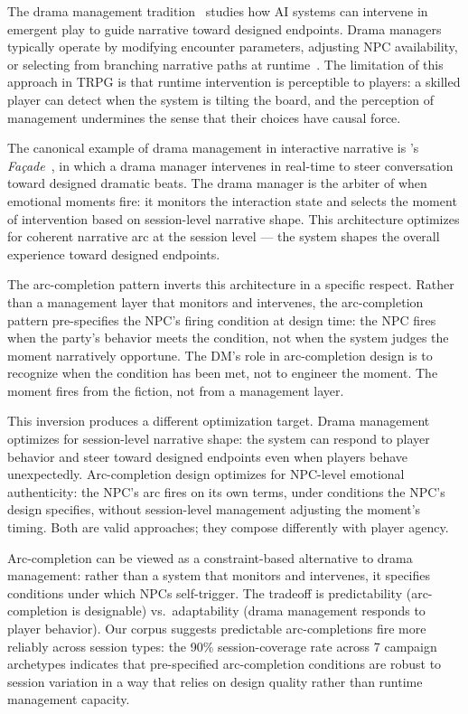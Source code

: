 The drama management tradition~\cite{riedl2016} studies how AI systems can
intervene in emergent play to guide narrative toward designed endpoints. Drama
managers typically operate by modifying encounter parameters, adjusting NPC
availability, or selecting from branching narrative paths at
runtime~\cite{ryan2017narrative}. The limitation of this approach in TRPG is
that runtime intervention is perceptible to players: a skilled player can detect
when the system is tilting the board, and the perception of management undermines
the sense that their choices have causal force.

The canonical example of drama management in interactive narrative is
\citeauthor{mateas2003faade}'s \textit{Façade}~\citeyear{mateas2003faade}, in
which a drama manager intervenes in real-time to steer conversation toward
designed dramatic beats. The drama manager is the arbiter of when emotional
moments fire: it monitors the interaction state and selects the moment of
intervention based on session-level narrative shape. This architecture optimizes
for coherent narrative arc at the session level --- the system shapes the overall
experience toward designed endpoints.

The arc-completion pattern inverts this architecture in a specific respect. Rather
than a management layer that monitors and intervenes, the arc-completion pattern
pre-specifies the NPC's firing condition at design time: the NPC fires when the
party's behavior meets the condition, not when the system judges the moment
narratively opportune. The DM's role in arc-completion design is to recognize
when the condition has been met, not to engineer the moment. The moment fires from
the fiction, not from a management layer.

This inversion produces a different optimization target. Drama management optimizes
for session-level narrative shape: the system can respond to player behavior and
steer toward designed endpoints even when players behave unexpectedly. Arc-completion
design optimizes for NPC-level emotional authenticity: the NPC's arc fires on its
own terms, under conditions the NPC's design specifies, without session-level
management adjusting the moment's timing. Both are valid approaches; they compose
differently with player agency.

Arc-completion can be viewed as a constraint-based alternative to drama management:
rather than a system that monitors and intervenes, it specifies conditions under
which NPCs self-trigger. The tradeoff is predictability (arc-completion is
designable) vs.\ adaptability (drama management responds to player behavior). Our
corpus suggests predictable arc-completions fire more reliably across session types:
the 90\% session-coverage rate across 7 campaign archetypes indicates that pre-specified
arc-completion conditions are robust to session variation in a way that relies on
design quality rather than runtime management capacity.

